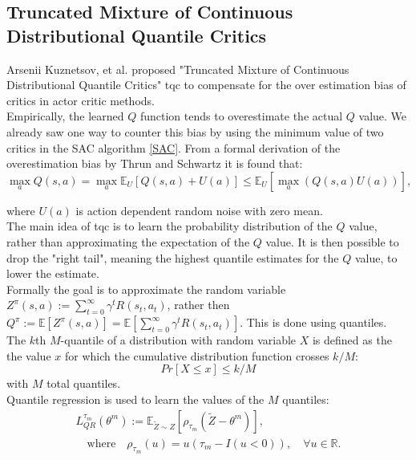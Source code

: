 \subsection{Truncated Mixture of Continuous Distributional Quantile Critics}
\label{section:TQC}
Arsenii Kuznetsov, et al. proposed "Truncated Mixture of Continuous Distributional Quantile Critics" \ac{tqc} \cite{TQC_Paper} to compensate for the over estimation bias of critics in actor critic methods.\\
Empirically, the learned $Q$ function tends to overestimate the actual $Q$ value. We already saw one way to counter this bias by using the minimum value of 
two critics in the SAC algorithm \ref{SAC}. From a formal derivation of the overestimation bias by 
Thrun and Schwartz \cite{thrun1993issues} it is found that:
\begin{equation}
    \label{eq:overestimation}
    \max_a Q(s,a) = \max_a \mathbb{E}_{U}\left[Q(s,a) + U(a)\right] \leq \mathbb{E}_{U}\left[\max_a \left( Q(s,a)  U(a)\right)\right],
\end{equation}

where $U(a)$ is action dependent random noise with zero mean. \\
The main idea of \ac{tqc} is to learn the probability distribution of the $Q$ value, rather than approximating the expectation of the $Q$ value. 
It is then possible to drop the "right tail", meaning the highest quantile estimates for the $Q$ value, to lower the estimate.\\
Formally the goal is to approximate the random variable $Z^\pi(s,a):=\sum_{t=0}^\infty\gamma^tR(s_t, a_t)$, rather then 
$Q^\pi  := \mathbb{E}[Z^\pi(s,a)] = \mathbb{E}[\sum_{t=0}^\infty\gamma^tR(s_t, a_t)]$. This is done using quantiles.\\
The $k$th $M$-quantile of a distribution with random variable $X$ is defined as the the value $x$ for which the cumulative distribution function crosses $k/M$:
\begin{equation}
    Pr[X \leq x] \leq k/M
\end{equation}
with $M$ total quantiles. \\
Quantile regression is used to learn the values of the $M$ quantiles:
\begin{align}
    \label{rho}
    L^{\tau_m}_{QR}(\theta^m) := \mathbb{E}_{\tilde{Z}\sim Z}\left[\rho_{\tau_m}(\tilde{Z}-\theta^m)\right],\\
    \quad \text{where} \quad \rho_{\tau_m}(u) = u({\tau_m} - I(u < 0)), \quad \forall u \in \mathbb{R}.
\end{align}
    

